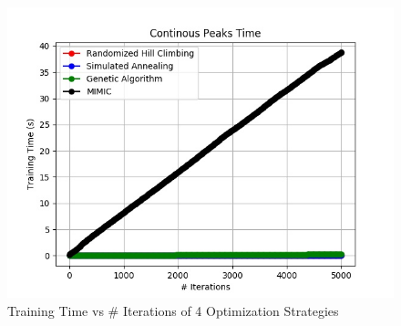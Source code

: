\documentclass[h]{article}
\begin{document}
\begin{figure}[H]
      \includegraphics[width=1\textwidth,keepaspectratio]{continous_peaks_time.jpg} 
      \caption*{Training Time vs # Iterations of 4 Optimization Strategies} 
   \endminipage\hfill
\end{figure}
\end{document}
